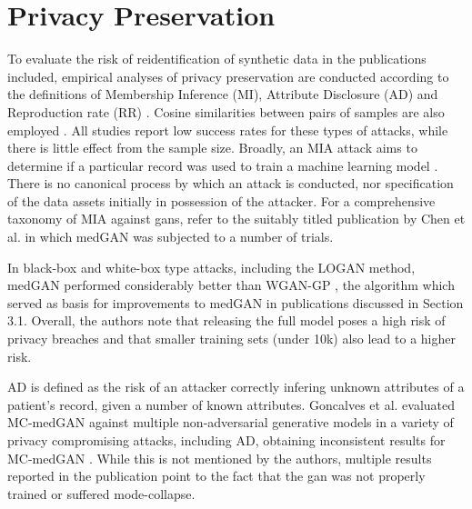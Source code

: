 \section{Privacy Preservation}
To evaluate the risk of reidentification of synthetic data in the publications included, empirical analyses of privacy preservation are conducted according to the definitions of Membership Inference (MI), Attribute Disclosure (AD)  \cite{choi2017generating,Goncalves2020,yan2020generating} and Reproduction rate (RR) \cite{Zhang2020-wp}. Cosine similarities between pairs of samples are also employed \cite{torfi2019generating}. All studies report low success rates for these types of attacks, while there is little effect from the sample size. Broadly, an MIA attack aims to determine if a particular record was used to train a machine learning model \cite{chen2019ganleaks}. There is no canonical process by which an attack is conducted, nor specification of the data assets initially in possession of the attacker. For a comprehensive taxonomy of MIA against \glspl{gan}, refer to the suitably titled publication by Chen et al. in which medGAN was subjected to a number of trials.\par
In black-box and white-box type attacks, including the LOGAN \cite{hayes2017logan} method, medGAN performed considerably better than WGAN-GP \cite{gulrajani2017improved}, the algorithm which served as basis for improvements to medGAN in publications discussed in Section 3.1. Overall, the authors note that releasing the full model poses a high risk of privacy breaches and that smaller training sets (under 10k) also lead to a higher risk.\par  
AD is defined as the risk of an attacker correctly infering unknown attributes of a patient's record, given a number of known attributes. Goncalves et al. evaluated MC-medGAN against multiple non-adversarial generative models in a variety of privacy compromising attacks, including AD, obtaining inconsistent results for MC-medGAN \cite{Goncalves2020}. While this is not mentioned by the authors, multiple results reported in the publication point to the fact that the \gls{gan} was not properly trained or suffered mode-collapse.\par
